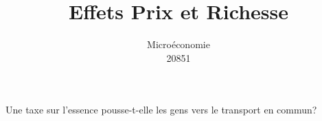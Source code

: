 \documentclass[handout]{beamer}
\title{Effets Prix et Richesse}
\author{Microéconomie \\ 20851}
\date{}
\begin{document}
\frame{\titlepage}

\section[Outline]{}
\frame{\tableofcontents}

\begin{frame}{Une taxe sur l'essence pousse-t-elle les gens vers le transport en commun?}
\begin{figure}

\end{figure}
\end{frame}
\end{document}
